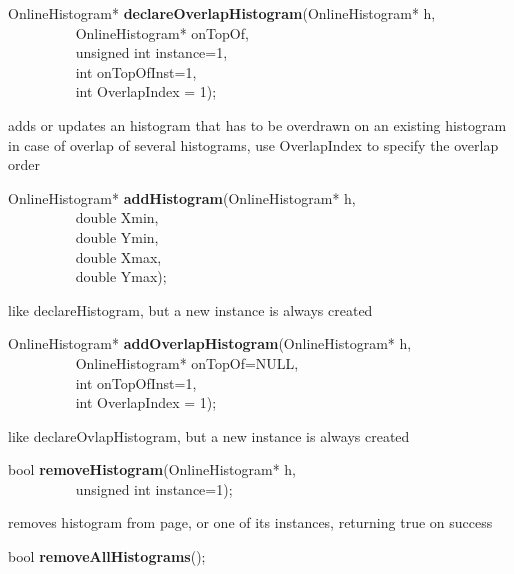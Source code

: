 \item    OnlineHistogram* {\bf declareOverlapHistogram}(OnlineHistogram* h,\\\mbox{}~~~~~~~~~
                                           OnlineHistogram* onTopOf,\\\mbox{}~~~~~~~~~
                                           unsigned int instance=1,\\\mbox{}~~~~~~~~~
                                           int onTopOfInst=1,\\\mbox{}~~~~~~~~~
                                           int OverlapIndex = 1);

 adds or updates an histogram that has to be overdrawn on an existing histogram
 in case of overlap of several histograms, use OverlapIndex to specify the overlap order


\item    OnlineHistogram* {\bf addHistogram}(OnlineHistogram* h,\\\mbox{}~~~~~~~~~
                                double Xmin,\\\mbox{}~~~~~~~~~
                                double Ymin,\\\mbox{}~~~~~~~~~
                                double Xmax,\\\mbox{}~~~~~~~~~
                                double Ymax);

 like declareHistogram, but a new instance is always created


\item    OnlineHistogram* {\bf addOverlapHistogram}(OnlineHistogram* h,\\\mbox{}~~~~~~~~~
                                       OnlineHistogram* onTopOf=NULL,\\\mbox{}~~~~~~~~~
                                       int onTopOfInst=1,\\\mbox{}~~~~~~~~~
                                       int OverlapIndex = 1);

 like declareOvlapHistogram, but a new instance is always created


\item    bool {\bf removeHistogram}(OnlineHistogram* h,\\\mbox{}~~~~~~~~~
                       unsigned int instance=1);

 removes histogram from page, or one of its instances, returning true on success


\item    bool {\bf removeAllHistograms}();



